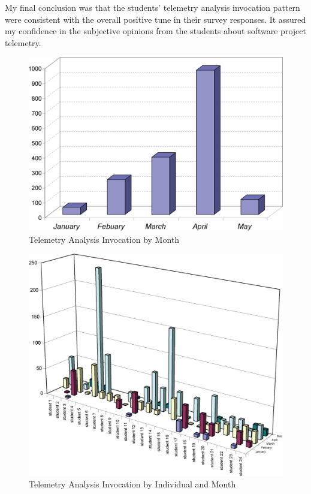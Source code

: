 My final conclusion was that the students' telemetry analysis invocation pattern were consistent with the overall positive tune in their survey responses. It assured my confidence in the subjective opinions from the students about software project telemetry.

\begin{figure}[tbp]
  \centering
  \includegraphics[width=1.00\textwidth]{figures/ClassroomStudyTotalInvocation}
  \caption{Telemetry Analysis Invocation by Month} 
  \label{fig:ClassroomStudyTotalInvocation}
\end{figure}


\begin{figure}[tbp]
  \centering
  \includegraphics[width=1.00\textwidth]{figures/ClassroomStudyIndividualInvocation}
  \caption{Telemetry Analysis Invocation by Individual and Month} 
  \label{fig:ClassroomStudyIndividualInvocation}
\end{figure}




